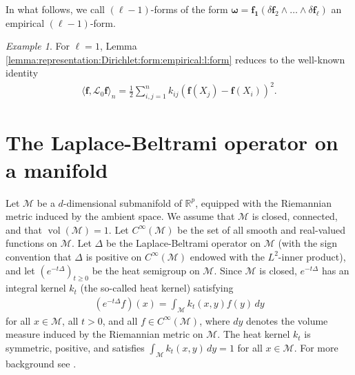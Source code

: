 \documentclass[10pt]{article}
\theoremstyle{plain}
\theoremstyle{definition}
\theoremstyle{remark}
\newtheorem{example}{Example}
\begin{document}
    In what follows, we call $(\ell-1)$-forms of the form $\boldsymbol{\omega}=\mathbf{f_1}(\delta\mathbf{f}_2\wedge\dots\wedge \delta\mathbf{f_\ell})$ an empirical $(\ell-1)$-form.

    \begin{example}
        For $\ell=1$, Lemma \ref{lemma:representation:Dirichlet:form:empirical:l:form} reduces to the well-known identity
        \begin{align}\label{eq:GL:BF}
            \langle\mathbf{f},\mathscr{L}_{0}\mathbf{f}\rangle_n=\frac{1}{2}\sum_{i,j=1}^nk_{ij}(\mathbf{f}(X_j)-\mathbf{f}(X_i))^2.
        \end{align}
    \end{example}
    
\section{The Laplace-Beltrami operator on a manifold}
\label{section:LapMfld}

Let $\mathcal{M}$ be a $d$-dimensional submanifold of $\mathbb{R}^p$, equipped with the Riemannian metric induced by the ambient space. We assume that $\mathcal{M}$ is closed, connected, and that $\operatorname{vol}(\mathcal{M})=1$. Let $C^\infty(\mathcal{M})$ be the set of all smooth and real-valued functions on $\mathcal{M}$. Let $\Delta$ be the Laplace-Beltrami operator on $\mathcal{M}$ (with the sign convention that $\Delta$ is positive on $C^\infty(\mathcal{M})$ endowed with the $L^2$-inner product), and let $(e^{-t\Delta})_{t\geq 0}$ be the heat semigroup on $\mathcal{M}$. Since $\mathcal{M}$ is closed, $e^{-t\Delta}$ has an integral kernel $k_t$ (the so-called heat kernel) satisfying
\begin{align}\label{eq:integral:kernel}
    (e^{-t\Delta}f)(x)=\int_{\mathcal{M}}k_t(x,y)f(y)\,dy
\end{align}
for all $x\in\mathcal{M}$, all $t> 0$, and all $f\in C^\infty(\mathcal{M})$, where $dy$ denotes the volume measure induced by the Riemannian metric on $\mathcal{M}$. The heat kernel $k_t$ is symmetric, positive, and satisfies $\int_{\mathcal{M}}k_t(x,y)\,dy=1$ for all $x\in\mathcal{M}$. For more background see \cite{Ros97,Gri09,War83}.
\end{document}
